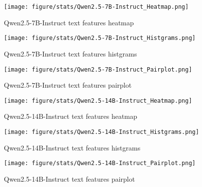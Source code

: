 \begin{figure}[H]
    \centering
    \texttt{[image: figure/stats/Qwen2.5-7B-Instruct\_Heatmap.png]}
    \caption{Qwen2.5-7B-Instruct text features heatmap}
    \label{fig:human_heatmap}
\end{figure}


\begin{figure}[H]
    \centering
    \texttt{[image: figure/stats/Qwen2.5-7B-Instruct\_Histgrams.png]}
    \caption{Qwen2.5-7B-Instruct text features histgrams}
    \label{fig:human_hist}
\end{figure}


\begin{figure}[H]
    \centering
    \texttt{[image: figure/stats/Qwen2.5-7B-Instruct\_Pairplot.png]}
    \caption{Qwen2.5-7B-Instruct text features pairplot}
    \label{fig:human_pairplot}
\end{figure}




\begin{figure}[H]
    \centering
    \texttt{[image: figure/stats/Qwen2.5-14B-Instruct\_Heatmap.png]}
    \caption{Qwen2.5-14B-Instruct text features heatmap}
    \label{fig:human_heatmap}
\end{figure}


\begin{figure}[H]
    \centering
    \texttt{[image: figure/stats/Qwen2.5-14B-Instruct\_Histgrams.png]}
    \caption{Qwen2.5-14B-Instruct text features histgrams}
    \label{fig:human_hist}
\end{figure}


\begin{figure}[H]
    \centering
    \texttt{[image: figure/stats/Qwen2.5-14B-Instruct\_Pairplot.png]}
    \caption{Qwen2.5-14B-Instruct text features pairplot}
    \label{fig:human_pairplot}
\end{figure}




